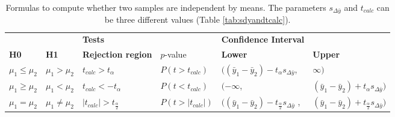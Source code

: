 \documentclass[10pt,a4paper]{article}
\begin{document}
	\begin{table}[h!]
	\centering
	\caption{Formulas to compute whether two samples are independent by means. 
	The parameters $s_{\Delta\bar{y}}$ and $t_{calc}$ can be three different 
	values (Table \ref{tab:sdyandtcalc}). \cite{heiberger2004statistical}}
	\label{tab:IndepTest}
	\begin{tabular}{llllll}
		\hline
		 &  & 
		\multicolumn{2}{l}{\textbf{Tests}} & 
		\textbf{Confidence Interval} & \textbf{}               \\ \cline{3-6} 
		\textbf{H0}              & \textbf{H1}              & \textbf{Rejection 
		region}   & $p$-value                      & 
		\textbf{Lower}               & \textbf{Upper}          \\ \hline
		$\mu_1 \leq \mu_2$                  & $\mu_1 > \mu_2$       & 
		$t_{calc} 
		> t_\alpha$       & $P(t > t_{calc})$      & 
		$((\bar{y}_1 
		- \bar{y}_2) - t_\alpha s_{\Delta \bar{y}}$,       & 
		$\infty)$                     \\
		$\mu_1 \geq \mu_2$                  & $\mu_1 < \mu_2$          & 
		$t_{calc} 
		< -t_\alpha$          & $P(t < t_{calc})$         & 
		$(-\infty$,                        & $(\bar{y}_1 - \bar{y}_2) + 
		t_\alpha 
		s_{\Delta \bar{y}})$ \\
		$\mu_1 = \mu_2$                  & $\mu_1 \neq \mu_2$                  
		& 
		$|t_{calc}| > t_{\frac{\alpha}{2}}$     & $P(t >
		|t_{calc}|)$  & $((\bar{y}_1 - \bar{y}_2) - 
		t_{\frac{\alpha}{2}} 
		s_{\Delta\bar{y}}$ 
		,     & $(\bar{y}_1 - \bar{y}_2) + t_{\frac{\alpha}{2}} 
		s_{\Delta 
		\bar{y}})$  
		\\ 
		\hline
	\end{tabular}
	\end{table}
	
\end{document}
